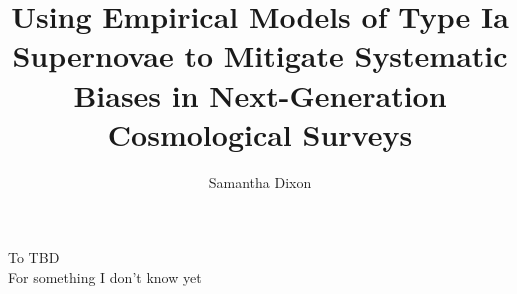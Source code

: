 \documentclass{ucbthesis}
\begin{document}

\title{Using Empirical Models of Type Ia Supernovae to Mitigate Systematic Biases in Next-Generation Cosmological Surveys}
\author{Samantha Dixon}


\maketitle
\approvalpage
\copyrightpage



\begin{frontmatter}

\begin{dedication}
\null\vfil
\begin{center}
To TBD \\\vspace{12pt}
For something I don't know yet
\end{center}
\vfil\null
\end{dedication}


\tableofcontents
\clearpage
\listoffigures
\clearpage
\listoftables

\begin{acknowledgements}

\end{acknowledgements}

\end{frontmatter}

\pagestyle{headings}











\appendix




\end{document}
